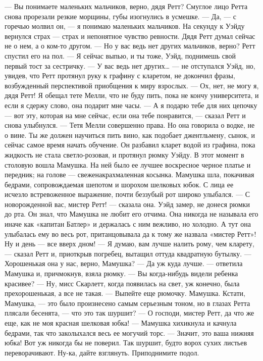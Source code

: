 — Вы понимаете маленьких мальчиков, верно, дядя Ретт? Смуглое лицо Ретта снова прорезали резкие морщины, губы изогнулись в усмешке.
— Да, — с горечью молвил он, — я понимаю маленьких мальчиков. На секунду к Уэйду вернулся страх — страх и непонятное чувство ревности. Дядя Ретт думал сейчас не о нем, а о ком-то другом.
— Но у вас ведь нет других мальчиков, верно? Ретт спустил его на пол.
— Я сейчас выпью, и ты тоже, Уэйд, поднимешь свой первый тост за сестричку.
— У вас ведь нет других… — не отступался Уэйд, но, увидев, что Ретт протянул руку к графину с кларетом, не докончил фразы, возбужденный перспективой приобщения к миру взрослых. — Ох, нет, не могу я, дядя Ретт! Я обещал тете Мелли, что не буду пить, пока не кончу университета, и если я сдержу слово, она подарит мне часы.
— А я подарю тебе для них цепочку — вот эту, которая на мне сейчас, если она тебе понравится, — сказал Ретт и снова улыбнулся. — Тетя Мелли совершенно права. Но она говорила о водке, не о вине. Ты же должен научиться пить вино, как подобает джентльмену, сынок, и сейчас самое время начать обучение.
Он разбавил кларет водой из графина, пока жидкость не стала светло-розовая, и протянул рюмку Уэйду. В этот момент в столовую вошла Мамушка. На ней было ее лучшее воскресное черное платье и передник; на голове — свеженакрахмаленная косынка. Мамушка шла, покачивая бедрами, сопровождаемая шепотом и шорохом шелковых юбок. С лица ее исчезло встревоженное выражение, почти беззубый рот широко улыбался.
— С новорожденной вас, мистер Ретт! — сказала она. Уэйд замер, не донеся рюмки до рта. Он знал, что Мамушка не любит его отчима. Она никогда не называла его иначе как «капитан Батлер» и держалась с ним вежливо, но холодно. А тут она улыбалась ему во весь рот, пританцовывала да к тому же назвала «мистер Ретт»! Ну и день — все вверх дном!
— Я думаю, вам лучше налить рому, чем кларету, — сказал Ретт и, приоткрыв погребец, вытащил оттуда квадратную бутылку. — Хорошенькая она у нас, верно, Мамушка?
— Да уж куда лучше. — ответила Мамушка и, причмокнув, взяла рюмку.
— Вы когда-нибудь видели ребенка красивее?
— Ну, мисс Скарлетт, когда появилась на свет, уж конечно, была прехорошенькая, а все не такая.
— Выпейте еще рюмочку. Мамушка. Кстати, Мамушка, — это было произнесено самым серьезным тоном, но в глазах Ретта плясали бесенята, — что это так шуршит?
— О господи, мистер Ретт, да что же еще, как не моя красная шелковая юбка! — Мамушка хихикнула и качнула бедрами, так что заколыхался весь ее могучий торс.
— Значит, это ваша нижняя юбка! Вот уж никогда бы не поверил. Так шуршит, будто ворох сухих листьев переворачивают. Ну-ка, дайте взглянуть. Приподнимите подол.
